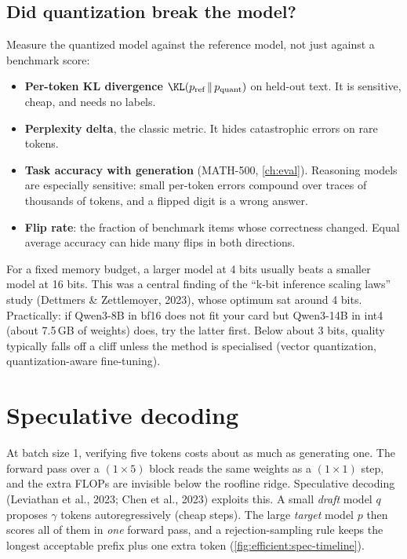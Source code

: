 \subsection{Did quantization break the model?}
Measure the quantized model against the reference model, not just against a benchmark
score:
\begin{itemize}
  \item \textbf{Per-token KL divergence} $\KL(p_{\text{ref}}\,\|\,p_{\text{quant}})$ on held-out
        text. It is sensitive, cheap, and needs no labels.
  \item \textbf{Perplexity delta}, the classic metric. It hides catastrophic errors on
        rare tokens.
  \item \textbf{Task accuracy with generation} (MATH-500, \cref{ch:eval}). Reasoning
        models are especially sensitive: small per-token errors compound over traces of
        thousands of tokens, and a flipped digit is a wrong answer.
  \item \textbf{Flip rate}: the fraction of benchmark items whose correctness changed.
        Equal average accuracy can hide many flips in both directions.
\end{itemize}

\begin{deepdive}
For a fixed memory budget, a larger model at 4 bits usually beats a smaller model at 16
bits. This was a central finding of the ``k-bit inference scaling laws'' study (Dettmers
\& Zettlemoyer, 2023), whose optimum sat around 4 bits. Practically: if Qwen3-8B in bf16
does not fit your card but Qwen3-14B in int4 (about 7.5\,GB of weights) does, try the
latter first. Below about 3 bits, quality typically falls off a cliff unless the method
is specialised (vector quantization, quantization-aware fine-tuning).
\end{deepdive}

\section{Speculative decoding}\label{sec:efficient:spec}

At batch size 1, verifying five tokens costs about as much as generating one. The
forward pass over a $(1\times 5)$ block reads the same weights as a $(1\times1)$ step,
and the extra FLOPs are invisible below the roofline ridge. Speculative decoding (Leviathan
et al., 2023; Chen et al., 2023) exploits this. A small \emph{draft} model $q$
proposes $\gamma$ tokens autoregressively (cheap steps). The large \emph{target} model
$p$ then scores all of them in \emph{one} forward pass, and a rejection-sampling rule
keeps the longest acceptable prefix plus one extra token
(\cref{fig:efficient:spec-timeline}).

